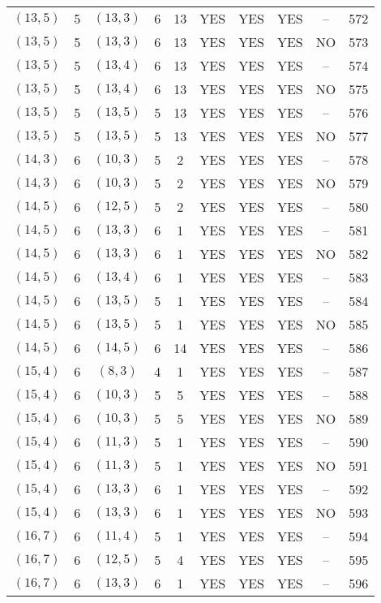\begin{longtable}{|c|c|c|c|c|c|c|c|c|c|}
$(13, 5)$ & 5 & $(13, 3)$ & 6 & 13 & YES & YES & YES & -- & 572\\
$(13, 5)$ & 5 & $(13, 3)$ & 6 & 13 & YES & YES & YES & NO & 573\\
$(13, 5)$ & 5 & $(13, 4)$ & 6 & 13 & YES & YES & YES & -- & 574\\
$(13, 5)$ & 5 & $(13, 4)$ & 6 & 13 & YES & YES & YES & NO & 575\\
$(13, 5)$ & 5 & $(13, 5)$ & 5 & 13 & YES & YES & YES & -- & 576\\
$(13, 5)$ & 5 & $(13, 5)$ & 5 & 13 & YES & YES & YES & NO & 577\\
$(14, 3)$ & 6 & $(10, 3)$ & 5 & 2 & YES & YES & YES & -- & 578\\
$(14, 3)$ & 6 & $(10, 3)$ & 5 & 2 & YES & YES & YES & NO & 579\\
$(14, 5)$ & 6 & $(12, 5)$ & 5 & 2 & YES & YES & YES & -- & 580\\
$(14, 5)$ & 6 & $(13, 3)$ & 6 & 1 & YES & YES & YES & -- & 581\\
$(14, 5)$ & 6 & $(13, 3)$ & 6 & 1 & YES & YES & YES & NO & 582\\
$(14, 5)$ & 6 & $(13, 4)$ & 6 & 1 & YES & YES & YES & -- & 583\\
$(14, 5)$ & 6 & $(13, 5)$ & 5 & 1 & YES & YES & YES & -- & 584\\
$(14, 5)$ & 6 & $(13, 5)$ & 5 & 1 & YES & YES & YES & NO & 585\\
$(14, 5)$ & 6 & $(14, 5)$ & 6 & 14 & YES & YES & YES & -- & 586\\
$(15, 4)$ & 6 & $(8, 3)$ & 4 & 1 & YES & YES & YES & -- & 587\\
$(15, 4)$ & 6 & $(10, 3)$ & 5 & 5 & YES & YES & YES & -- & 588\\
$(15, 4)$ & 6 & $(10, 3)$ & 5 & 5 & YES & YES & YES & NO & 589\\
$(15, 4)$ & 6 & $(11, 3)$ & 5 & 1 & YES & YES & YES & -- & 590\\
$(15, 4)$ & 6 & $(11, 3)$ & 5 & 1 & YES & YES & YES & NO & 591\\
$(15, 4)$ & 6 & $(13, 3)$ & 6 & 1 & YES & YES & YES & -- & 592\\
$(15, 4)$ & 6 & $(13, 3)$ & 6 & 1 & YES & YES & YES & NO & 593\\
$(16, 7)$ & 6 & $(11, 4)$ & 5 & 1 & YES & YES & YES & -- & 594\\
$(16, 7)$ & 6 & $(12, 5)$ & 5 & 4 & YES & YES & YES & -- & 595\\
$(16, 7)$ & 6 & $(13, 3)$ & 6 & 1 & YES & YES & YES & -- & 596\\

\end{longtable}
